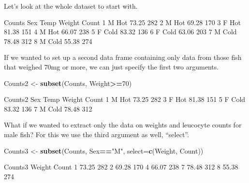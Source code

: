 \documentclass[
]{book}
\newenvironment{Shaded}{\begin{snugshade}}{\end{snugshade}}
\newcommand{\DataTypeTok}[1]{\textcolor[rgb]{0.13,0.29,0.53}{#1}}
\newcommand{\DecValTok}[1]{\textcolor[rgb]{0.00,0.00,0.81}{#1}}
\newcommand{\FloatTok}[1]{\textcolor[rgb]{0.00,0.00,0.81}{#1}}
\newcommand{\KeywordTok}[1]{\textcolor[rgb]{0.13,0.29,0.53}{\textbf{#1}}}
\newcommand{\NormalTok}[1]{#1}
\newcommand{\OperatorTok}[1]{\textcolor[rgb]{0.81,0.36,0.00}{\textbf{#1}}}
\newcommand{\StringTok}[1]{\textcolor[rgb]{0.31,0.60,0.02}{#1}}
\begin{document}
Let's look at the whole dataset to start with.

\begin{Shaded}
\begin{Highlighting}[]
\NormalTok{Counts}
\NormalTok{  Sex   Temp Weight Count}
\DecValTok{1}\NormalTok{   M  Hot    }\FloatTok{73.25}   \DecValTok{282}
\DecValTok{2}\NormalTok{   M  Hot    }\FloatTok{69.28}   \DecValTok{170}
\DecValTok{3}\NormalTok{   F  Hot    }\FloatTok{81.38}   \DecValTok{151}
\DecValTok{4}\NormalTok{   M  Hot    }\FloatTok{66.07}   \DecValTok{238}
\DecValTok{5}\NormalTok{   F Cold    }\FloatTok{83.32}   \DecValTok{136}
\DecValTok{6}\NormalTok{   F Cold    }\FloatTok{63.06}   \DecValTok{203}
\DecValTok{7}\NormalTok{   M Cold    }\FloatTok{78.48}   \DecValTok{312}
\DecValTok{8}\NormalTok{   M Cold    }\FloatTok{55.38}   \DecValTok{274}
\end{Highlighting}
\end{Shaded}

If we wanted to set up a second data frame containing only data from those fish that weighed 70mg or more, we can just specify the first two arguments.

\begin{Shaded}
\begin{Highlighting}[]
\NormalTok{Counts2 <-}\StringTok{ }\KeywordTok{subset}\NormalTok{(Counts, Weight}\OperatorTok{>=}\DecValTok{70}\NormalTok{)}

\NormalTok{Counts2}
\NormalTok{  Sex   Temp Weight Count}
\DecValTok{1}\NormalTok{   M  Hot    }\FloatTok{73.25}   \DecValTok{282}
\DecValTok{3}\NormalTok{   F  Hot    }\FloatTok{81.38}   \DecValTok{151}
\DecValTok{5}\NormalTok{   F Cold    }\FloatTok{83.32}   \DecValTok{136}
\DecValTok{7}\NormalTok{   M Cold    }\FloatTok{78.48}   \DecValTok{312}
\end{Highlighting}
\end{Shaded}

What if we wanted to extract only the data on weights and leucocyte counts for male fish? For this we use the third argument as well, ``select''.

\begin{Shaded}
\begin{Highlighting}[]
\NormalTok{Counts3 <-}\StringTok{ }\KeywordTok{subset}\NormalTok{(Counts, Sex}\OperatorTok{==}\StringTok{"M"}\NormalTok{, }\DataTypeTok{select=}\KeywordTok{c}\NormalTok{(Weight, Count))}

\NormalTok{Counts3}
\NormalTok{  Weight Count}
\DecValTok{1}  \FloatTok{73.25}   \DecValTok{282}
\DecValTok{2}  \FloatTok{69.28}   \DecValTok{170}
\DecValTok{4}  \FloatTok{66.07}   \DecValTok{238}
\DecValTok{7}  \FloatTok{78.48}   \DecValTok{312}
\DecValTok{8}  \FloatTok{55.38}   \DecValTok{274}
\end{Highlighting}
\end{Shaded}
\end{document}
